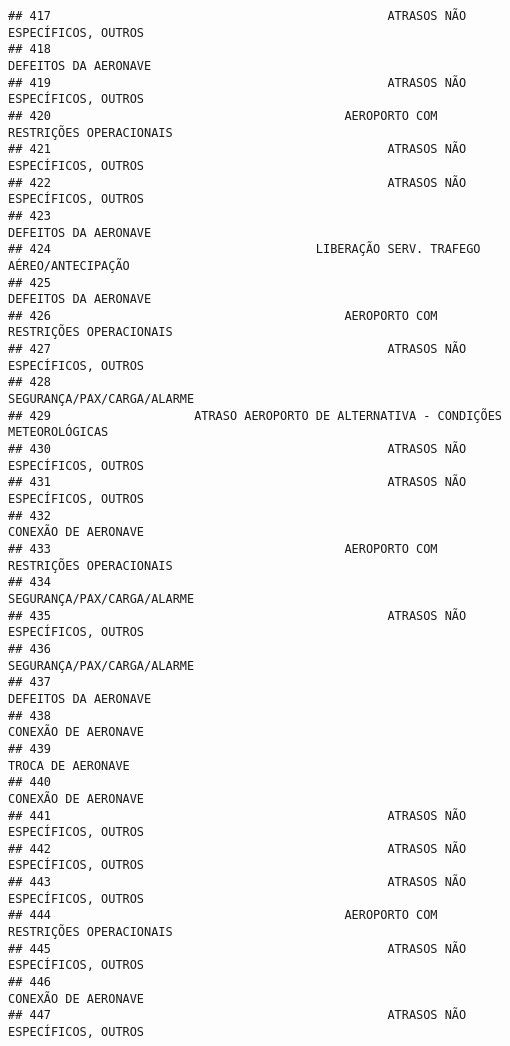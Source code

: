 \documentclass[
]{article}
\begin{document}
\begin{verbatim}
## 417                                               ATRASOS NÃO ESPECÍFICOS, OUTROS
## 418                                                          DEFEITOS DA AERONAVE
## 419                                               ATRASOS NÃO ESPECÍFICOS, OUTROS
## 420                                         AEROPORTO COM RESTRIÇÕES OPERACIONAIS
## 421                                               ATRASOS NÃO ESPECÍFICOS, OUTROS
## 422                                               ATRASOS NÃO ESPECÍFICOS, OUTROS
## 423                                                          DEFEITOS DA AERONAVE
## 424                                     LIBERAÇÃO SERV. TRAFEGO AÉREO/ANTECIPAÇÃO
## 425                                                          DEFEITOS DA AERONAVE
## 426                                         AEROPORTO COM RESTRIÇÕES OPERACIONAIS
## 427                                               ATRASOS NÃO ESPECÍFICOS, OUTROS
## 428                                                    SEGURANÇA/PAX/CARGA/ALARME
## 429                    ATRASO AEROPORTO DE ALTERNATIVA - CONDIÇÕES METEOROLÓGICAS
## 430                                               ATRASOS NÃO ESPECÍFICOS, OUTROS
## 431                                               ATRASOS NÃO ESPECÍFICOS, OUTROS
## 432                                                           CONEXÃO DE AERONAVE
## 433                                         AEROPORTO COM RESTRIÇÕES OPERACIONAIS
## 434                                                    SEGURANÇA/PAX/CARGA/ALARME
## 435                                               ATRASOS NÃO ESPECÍFICOS, OUTROS
## 436                                                    SEGURANÇA/PAX/CARGA/ALARME
## 437                                                          DEFEITOS DA AERONAVE
## 438                                                           CONEXÃO DE AERONAVE
## 439                                                             TROCA DE AERONAVE
## 440                                                           CONEXÃO DE AERONAVE
## 441                                               ATRASOS NÃO ESPECÍFICOS, OUTROS
## 442                                               ATRASOS NÃO ESPECÍFICOS, OUTROS
## 443                                               ATRASOS NÃO ESPECÍFICOS, OUTROS
## 444                                         AEROPORTO COM RESTRIÇÕES OPERACIONAIS
## 445                                               ATRASOS NÃO ESPECÍFICOS, OUTROS
## 446                                                           CONEXÃO DE AERONAVE
## 447                                               ATRASOS NÃO ESPECÍFICOS, OUTROS

\end{verbatim}
\end{document}
